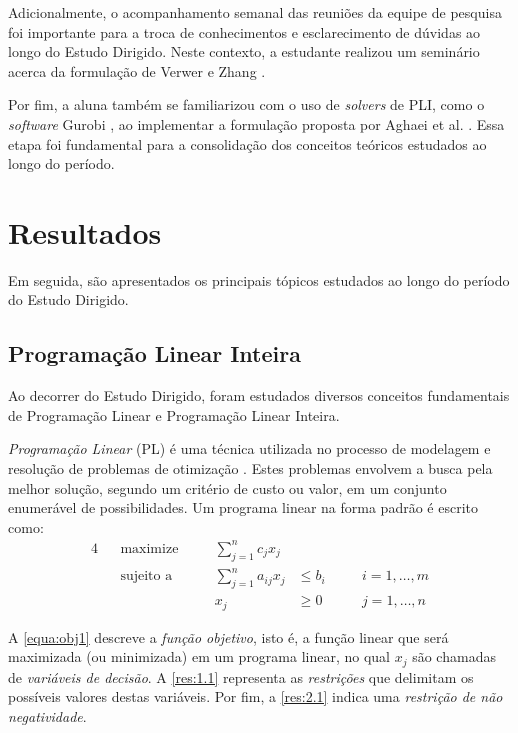 \documentclass[12pt,a4paper]{article}
\begin{document}
Adicionalmente, o acompanhamento semanal das reuniões da equipe de pesquisa foi importante 
para a troca de conhecimentos e esclarecimento de dúvidas ao longo do Estudo Dirigido. Neste contexto,
a estudante realizou um seminário acerca da formulação de Verwer e Zhang \cite{Verwer2019}.

Por fim, a aluna também se familiarizou com o uso de \emph{solvers} de PLI,
como o \emph{software} Gurobi \cite{Gurobi}, ao implementar a formulação proposta
por Aghaei et al. \cite{Aghaei24}. Essa etapa foi fundamental para a consolidação
dos conceitos teóricos estudados ao longo do período.

\section{Resultados} \label{sec:resultados}

Em seguida, são apresentados os principais tópicos estudados ao longo do período do Estudo Dirigido.

\subsection{Programação Linear Inteira}

Ao decorrer do Estudo Dirigido, foram estudados diversos conceitos fundamentais de Programação Linear e Programação Linear Inteira.

\emph{Programação Linear} (PL) é uma técnica utilizada no processo de modelagem
e resolução de problemas de otimização \cite{Chvatal1983}. Estes problemas envolvem
a busca pela melhor solução, segundo um critério de custo ou valor, em um conjunto enumerável
de possibilidades. Um programa linear na forma padrão é escrito como:
\begin{alignat}{4}
&&\text{maximize}   \quad && \sum_{j = 1}^{n} c_j x_j \label{equa:obj1}\\
&&\text{sujeito a} \quad && \sum_{j = 1}^{n} a_{ij} x_j & \leq b_i     \quad && i = 1, \ldots, m \label{res:1.1} \\
&&                        && x_j                       & \ge 0        \quad &&  j = 1, \ldots, n \label{res:2.1}
\end{alignat}

A \autoref{equa:obj1} descreve a \textit{função objetivo}, isto é, a função linear que será maximizada (ou minimizada) em um programa linear, no qual $x_j$ são chamadas de \textit{variáveis de decisão}. A \autoref{res:1.1} representa as \textit{restrições} que delimitam os possíveis valores destas variáveis. 
Por fim, a \autoref{res:2.1} indica uma \textit{restrição de não negatividade}.
\end{document}
